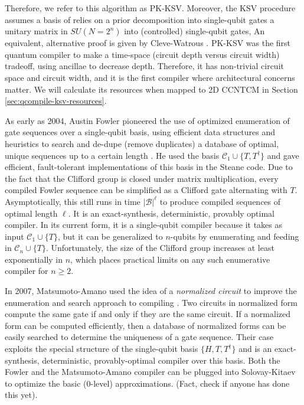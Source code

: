 Therefore, we
refer to this algorithm as PK-KSV.
Moreover, the KSV procedure assumes a basis of
relies on a prior decomposition into
single-qubit gates
a unitary matrix in $SU(N=2^n)$ into (controlled) single-qubit gates,
An equivalent, alternative proof is given by Cleve-Watrous \cite{Cleve2000}.
PK-KSV was the first quantum compiler to make a time-space (circuit depth
versus circuit width) tradeoff,
using ancillae to decrease depth. Therefore, it has non-trivial circuit space
and circuit width, and it is the first compiler where architectural concerns
matter.
We will calculate its resources when mapped to
\textsf{2D CCNTCM} in Section \ref{sec:qcompile-ksv-resources}.


As early as 2004, Austin Fowler pioneered the use of optimized enumeration
of gate sequences over a single-qubit basis, using efficient data structures
and heuristics to search and de-dupe (remove duplicates) a database of optimal, unique
sequences up to
a certain length \cite{Fowler2011}. He used the basis $\mathcal{C}_1 \cup \{ T, T^{\dagger} \}$
and gave efficient, fault-tolerant implementations of this basis in the
Steane code. Due to the fact that the Clifford group is closed under
matrix multiplication, every compiled Fowler sequence can be simplified as a
Clifford gate alternating with $T$. Asymptotically, this still runs in time
$|\mathcal{B}|^\ell$ to produce compiled sequences of optimal length $\ell$.
It is an exact-synthesis, deterministic, provably optimal compiler.
In its current form, it is a single-qubit compiler because it takes as input
$\mathcal{C}_1 \cup \{T\}$, but it can be generalized to $n$-qubits by enumerating
and feeding in $\mathcal{C}_n \cup \{T\}$. Unfortunately, the size of the
Clifford group increases at least exponentially in $n$, which places practical
limits on any such enumerative compiler for $n \ge 2$.

In 2007, Matsumoto-Amano used the idea of a \emph{normalized circuit} to
improve the enumeration and search approach to compiling \cite{Matsumoto2008}. Two circuits in
normalized form compute the same gate if and only if they are the same
circuit. If a normalized form can be computed efficiently, then a
database of normalized forms can be easily searched to determine the
uniqueness of a gate sequence. Their case exploits the special structure
of the single-qubit basis $\{H,T,T^{\dagger}\}$ and is an exact-synthesis,
deterministic, provably-optimal compiler over this basis. Both the Fowler
and the Matsumoto-Amano compiler can be plugged into Solovay-Kitaev to
optimize the basic (0-level) approximations. (Fact, check if anyone
has done this yet).

